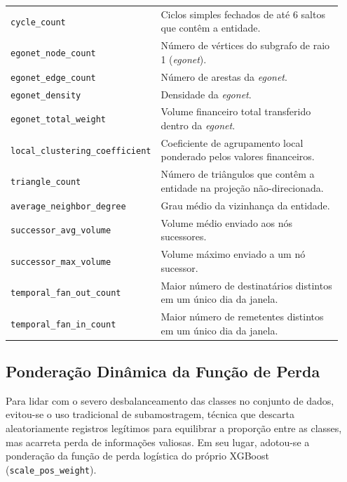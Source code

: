 \documentclass[titlepage,a4paper,oneside,onecolumn,12pt]{report}
\begin{document}
\begin{table}[htbp]
\begin{tabular}{p{0.38\linewidth}p{0.56\linewidth}}
        \texttt{cycle\_count} & Ciclos simples fechados de até 6 saltos que contêm a entidade. \\
        \texttt{egonet\_node\_count} & Número de vértices do subgrafo de raio 1 (\textit{egonet}). \\
        \texttt{egonet\_edge\_count} & Número de arestas da \textit{egonet}. \\
        \texttt{egonet\_density} & Densidade da \textit{egonet}. \\
        \texttt{egonet\_total\_weight} & Volume financeiro total transferido dentro da \textit{egonet}. \\
        \texttt{local\_clustering\_coefficient} & Coeficiente de agrupamento local ponderado pelos valores financeiros. \\
        \texttt{triangle\_count} & Número de triângulos que contêm a entidade na projeção não-direcionada. \\
        \texttt{average\_neighbor\_degree} & Grau médio da vizinhança da entidade. \\
        \texttt{successor\_avg\_volume} & Volume médio enviado aos nós sucessores. \\
        \texttt{successor\_max\_volume} & Volume máximo enviado a um nó sucessor. \\
        \texttt{temporal\_fan\_out\_count} & Maior número de destinatários distintos em um único dia da janela. \\
        \texttt{temporal\_fan\_in\_count} & Maior número de remetentes distintos em um único dia da janela. \\
        \hline
    \end{tabular}
\end{table}

\subsection{Ponderação Dinâmica da Função de Perda}
Para lidar com o severo desbalanceamento das classes no conjunto de dados, evitou-se o uso tradicional de subamostragem, técnica que descarta aleatoriamente registros legítimos para equilibrar a proporção entre as classes, mas acarreta perda de informações valiosas. Em seu lugar, adotou-se a ponderação da função de perda logística do próprio XGBoost (\texttt{scale\_pos\_weight}). 
\end{document}
